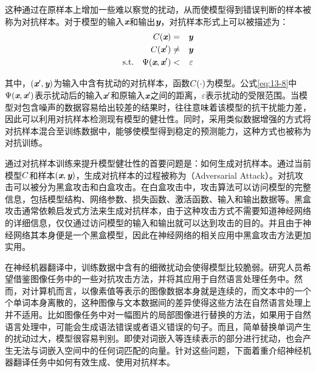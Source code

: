 \parinterval 这种通过在原样本上增加一些难以察觉的扰动，从而使模型得到错误判断的样本被称为对抗样本。对于模型的输入$\textbf{\em x}$和输出$\textbf{\em y}$，对抗样本形式上可以被描述为：
\begin{eqnarray}
{C}(\textbf{\em x}) &=& \textbf{\em y}
\label{eq:13-6}\\
{C}(\textbf{\em x}') &\neq& \textbf{\em y}
\label{eq:13-7}\\
\textrm{s.t.} \quad \Psi(\textbf{\em x},\textbf{\em x}') &<& \varepsilon
\label{eq:13-8}
\end{eqnarray}

\noindent 其中，$(\textbf{\em x}',\textbf{\em y})$为输入中含有扰动的对抗样本，函数${C}(\cdot)$为模型。公式\eqref{eq:13-8}中$\Psi(\textbf{\em x},\textbf{\em x}')$表示扰动后的输入$\textbf{\em x}'$和原输入$\textbf{\em x}$之间的距离，$\varepsilon$表示扰动的受限范围。当模型对包含噪声的数据容易给出较差的结果时，往往意味着该模型的抗干扰能力差，因此可以利用对抗样本检测现有模型的健壮性。同时，采用类似数据增强的方式将对抗样本混合至训练数据中，能够使模型得到稳定的预测能力，这种方式也被称为对抗训练。

\parinterval 通过对抗样本训练来提升模型健壮性的首要问题是：如何生成对抗样本。通过当前模型${C}$和样本$(\textbf{\em x},\textbf{\em y})$，生成对抗样本的过程被称为{\small{}}（Adversarial Attack）。对抗攻击可以被分为黑盒攻击和白盒攻击。在白盒攻击中，攻击算法可以访问模型的完整信息，包括模型结构、网络参数、损失函数、激活函数、输入和输出数据等。黑盒攻击通常依赖启发式方法来生成对抗样本，由于这种攻击方式不需要知道神经网络的详细信息，仅仅通过访问模型的输入和输出就可以达到攻击的目的。并且由于神经网络其本身便是一个黑盒模型，因此在神经网络的相关应用中黑盒攻击方法更加实用。

\parinterval 在神经机器翻译中，训练数据中含有的细微扰动会使得模型比较脆弱。研究人员希望借鉴图像任务中的一些对抗攻击方法，并将其应用于自然语言处理任务中。然而，对计算机而言，以像素值等表示的图像数据本身就是连续的，而文本中的一个个单词本身离散的，这种图像与文本数据间的差异使得这些方法在自然语言处理上并不适用。比如图像任务中对一幅图片的局部图像进行替换的方法，如果用于自然语言处理中，可能会生成语法错误或者语义错误的句子。而且，简单替换单词产生的扰动过大，模型很容易判别。即使对词嵌入等连续表示的部分进行扰动，也会产生无法与词嵌入空间中的任何词匹配的向量。针对这些问题，下面着重介绍神经机器翻译任务中如何有效生成、使用对抗样本。

